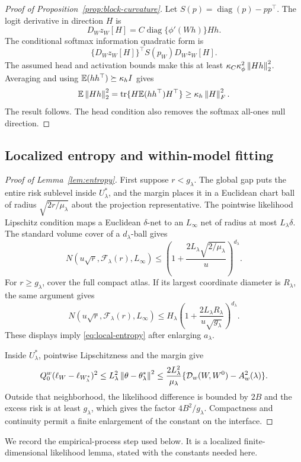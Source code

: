 \begin{proof}[Proof of Proposition~\ref{prop:block-curvature}]
Let \(S(p)=\operatorname{diag}(p)-pp^\top\). The logit derivative in direction \(H\) is
\[
D_Wz_W[H]=C\operatorname{diag}\{\phi'(Wh)\}Hh.
\]
The conditional softmax information quadratic form is
\[
\{D_Wz_W[H]\}^\top S(p_W)D_Wz_W[H].
\]
The assumed head and activation bounds make this at least
\(\kappa_C\kappa_\phi^2\left\lVert Hh\right\rVert_2^2\). Averaging and using
\(\mathbb E(hh^\top)\succeq\kappa_hI\) gives
\[
\mathbb E\left\lVert Hh\right\rVert_2^2=\operatorname{tr}\{H\mathbb E(hh^\top)H^\top\}
\ge\kappa_h\left\lVert H\right\rVert_F^2.
\]
The result follows. The head condition also removes the softmax all-ones null direction.
\end{proof}

\subsection{Localized entropy and within-model fitting}

\begin{proof}[Proof of Lemma~\ref{lem:entropy}]
First suppose \(r<g_\lambda\). The global gap puts the entire risk sublevel inside \(U_\lambda^*\), and the margin places it in a Euclidean chart ball of radius \(\sqrt{2r/\mu_\lambda}\) about the projection representative. The pointwise likelihood Lipschitz condition maps a Euclidean \(\delta\)-net to an \(L_\infty\) net of radius at most \(L_\lambda\delta\). The standard volume cover of a \(d_\lambda\)-ball gives
\[
N(u\sqrt r,\mathcal F_\lambda(r),L_\infty)
\le
\left(1+\frac{2L_\lambda\sqrt{2/\mu_\lambda}}{u}\right)^{d_\lambda}.
\]
For \(r\ge g_\lambda\), cover the full compact atlas. If its largest coordinate diameter is \(R_\lambda\), the same argument gives
\[
N(u\sqrt r,\mathcal F_\lambda(r),L_\infty)
\le H_\lambda
\left(1+\frac{2L_\lambda R_\lambda}{u\sqrt{g_\lambda}}\right)^{d_\lambda}.
\]
These displays imply \cref{eq:local-entropy} after enlarging \(a_\lambda\).

Inside \(U_\lambda^*\), pointwise Lipschitzness and the margin give
\[
Q_0^w(\ell_W-\ell_{W_\lambda^*})^2
\le L_\lambda^2\left\lVert \theta-\theta_\lambda^*\right\rVert^2
\le\frac{2L_\lambda^2}{\mu_\lambda}
\{\mathcal D_w(W,W^0)-A_w^2(\lambda)\}.
\]
Outside that neighborhood, the likelihood difference is bounded by \(2B\) and the excess risk is at least \(g_\lambda\), which gives the factor \(4B^2/g_\lambda\). Compactness and continuity permit a finite enlargement of the constant on the interface.
\end{proof}

We record the empirical-process step used below. It is a localized finite-dimensional likelihood lemma, stated with the constants needed here.

